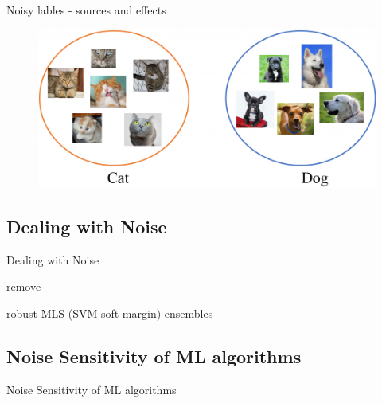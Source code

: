 \documentclass{beamer}\usepackage[]{graphicx}\usepackage[]{color}
\begin{document}
\begin{frame}[fragile]{Noisy lables - sources and effects\footnotemark[4]}
\begin{minipage}[c]{0.4\textwidth}
\begin{figure}
\end{figure}
\begin{figure}
	\includegraphics[width=0.75\linewidth]{cat_dog.png}
\end{figure}
\end{minipage}
\end{frame}

\subsection{Dealing with Noise}
\begin{frame}[fragile]{Dealing with Noise}
\tiny
\begin{minipage}[c]{0.5\textwidth}
remove
\end{minipage}%
\begin{minipage}[c]{0.5\textwidth}
robust MLS
(SVM soft margin) ensembles
\end{minipage}
\end{frame}

\subsection{Noise Sensitivity of ML algorithms}
\begin{frame}[fragile]{Noise Sensitivity of ML algorithms}
\tiny
\end{frame}
\end{document}
